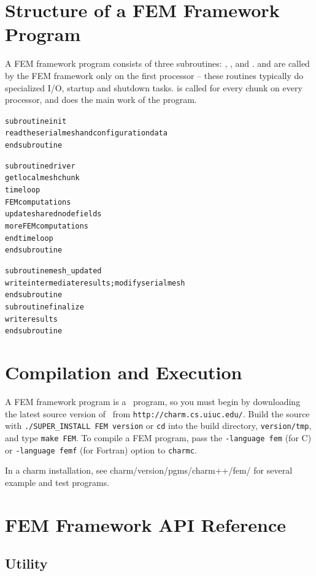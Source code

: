 \documentclass[10pt]{article}
\begin{document}
\section{Structure of a FEM Framework Program}

A FEM framework program consists of three subroutines: , ,
and .   and  are called by the FEM framework
only on the first processor -- these routines typically do specialized I/O,
startup and shutdown tasks.   is called for every chunk on every
processor, and does the main work of the program.

\begin{alltt}
     subroutine init
          read the serial mesh and configuration data
     end subroutine

     subroutine driver
          get local mesh chunk
          time loop
               FEM computations
               update shared node fields
               more FEM computations
          end time loop
     end subroutine

     subroutine mesh_updated
          write intermediate results; modify serial mesh
     end subroutine
     subroutine finalize
           write results
     end subroutine
\end{alltt}

\section{Compilation and Execution}

A FEM framework program is a \charmpp\ program, so you must begin by
downloading the latest source version of \charmpp\ from
{\tt http://charm.cs.uiuc.edu/}.  Build the source with 
{\tt ./SUPER\_INSTALL FEM version} or {\tt cd} into the build directory, 
{\tt version/tmp}, and type {\tt make FEM}.
To compile a FEM program, pass the {\tt -language fem} (for C) or 
{\tt -language femf} (for Fortran) option to {\tt charmc}.

In a charm installation, see charm/version/pgms/charm++/fem/
for several example and test programs.


\section{FEM Framework API Reference}

\subsection{Utility}
\end{document}
